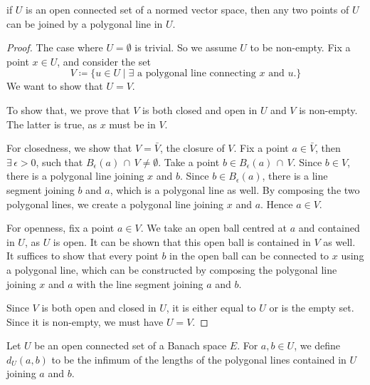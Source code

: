 \begin{theorem}
    \label{thm:existence_of_polygonal_line}
    \leanok
    if $U$ is an open connected set of a normed vector space, then any two points of $U$ can be joined by a polygonal line in $U$.
\end{theorem}
\begin{proof}
    \leanok
    The case where $U = \emptyset$ is trivial. So we assume $U$ to be non-empty.
    Fix a point $x \in U$, and consider the set
    \[V \coloneqq \{u \in U \mid \exists \text{ a polygonal line connecting } x \text{ and } u.\}\]
    We want to show that $U = V$.

    To show that, we prove that $V$ is both closed and open in $U$ and $V$ is non-empty.
    The latter is true, as $x$ must be in $V$.

    For closedness, we show that $V = \bar{V}$, the closure of $V$.
    Fix a point $a \in \bar{V}$, then $\exists\, \epsilon > 0$, such that $B_{\epsilon}(a)\,\cap\,V \neq \emptyset$.
    Take a point $b \in B_{\epsilon}(a)\,\cap\,V$.
    Since $b \in V$, there is a polygonal line joining $x$ and $b$.
    Since $b \in B_{\epsilon}(a)$, there is a line segment joining $b$ and $a$, which is a polygonal line as well.
    By composing the two polygonal lines, we create a polygonal line joining $x$ and $a$.
    Hence $a \in V$.

    For openness, fix a point $a \in V$.
    We take an open ball centred at $a$ and contained in $U$, as $U$ is open.
    It can be shown that this open ball is contained in $V$ as well.
    It suffices to show that every point $b$ in the open ball can be connected to $x$ using a polygonal line,
    which can be constructed by composing the polygonal line joining $x$ and $a$ with the line segment joining $a$ and $b$.

    Since $V$ is both open and closed in $U$, it is either equal to $U$ or is the empty set.
    Since it is non-empty, we must have $U = V$.
\end{proof}


\begin{definition}
    \label{def:distance_in_U}
    \leanok
    Let $U$ be an open connected set of a Banach space $E$. For $a, b \in U$, we define $d_U(a,b)$ to be the infimum of the lengths of the polygonal lines contained in $U$ joining $a$ and $b$.
\end{definition}

